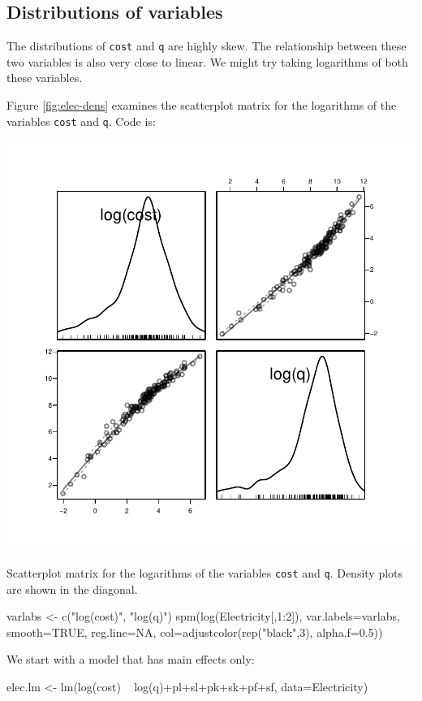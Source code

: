 \documentclass{tufte-book}\usepackage[]{graphicx}\usepackage[]{color}
\newcommand{\txtt}[1]{\texttt{#1}}
\begin{document}
\subsection*{Distributions of variables}

The distributions of \texttt{cost} and \texttt{q} are highly skew.
The relationship between these two variables is also very close to
linear.  We might try taking logarithms of both these variables.

Figure \ref{fig:elec-dens} examines the scatterplot matrix for the
logarithms of the variables \txtt{cost} and \txtt{q}.
\noindent
Code is:
\begin{marginfigure}[-3.5cm]
\begin{Schunk}


\centerline{\includegraphics[width=\textwidth]{figs/8-spm-cost-q-1} }

\end{Schunk}
  \caption{Scatterplot matrix for the logarithms of the variables
    \txtt{cost} and \txtt{q}. Density plots are shown in the
    diagonal.\label{fig:elec-dens}}
\end{marginfigure}
\begin{Schunk}
\begin{Sinput}
varlabs <- c("log(cost)", "log(q)")
spm(log(Electricity[,1:2]), var.labels=varlabs,
    smooth=TRUE, reg.line=NA,
    col=adjustcolor(rep("black",3), alpha.f=0.5))
\end{Sinput}
\end{Schunk}
We start with a model that has main effects only:
\begin{Schunk}
\begin{Sinput}
elec.lm <- lm(log(cost) ~ log(q)+pl+sl+pk+sk+pf+sf,
              data=Electricity)
\end{Sinput}
\end{Schunk}
\end{document}
